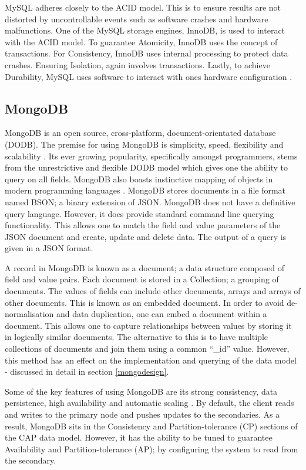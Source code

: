 MySQL adheres closely to the ACID model. This is to ensure results are not distorted by uncontrollable events such as software crashes and hardware malfunctions. One of the MySQL storage engines, InnoDB, is used to interact with the ACID model. To guarantee Atomicity, InnoDB uses the concept of transactions. For Consistency, InnoDB uses internal processing to protect data crashes. Ensuring Isolation, again involves transactions. Lastly, to achieve Durability, MySQL uses software to interact with ones hardware configuration \cite{mysqlacid}.

\subsection{MongoDB}\label{mongo}
MongoDB is an open source, cross-platform, document-orientated database (DODB). The premise for using MongoDB is simplicity, speed, flexibility and scalability \cite{md}. Its ever growing popularity, specifically amongst programmers, stems from the unrestrictive and flexible DODB model which gives one the ability to query on all fields. MongoDB also boasts instinctive mapping of objects in modern programming languages \cite{md}. MongoDB stores documents in a file format named BSON; a binary extension of JSON. MongoDB does not have a definitive query language. However, it does provide standard command line querying functionality. This allows one to match the field and value parameters of the JSON document and create, update and delete data. The output of a query is given in a JSON format.

A record in MongoDB is known as a document; a data structure composed of field and value pairs. Each document is stored in a Collection; a grouping of documents. The values of fields can include other documents, arrays and arrays of other documents. This is known as an embedded document. In order to avoid de-normalisation and data duplication, one can embed a document within a document. This allows one to capture relationships between values by storing it in logically similar documents. The alternative to this is to have multiple collections of documents and join them using a common ``\_id'' value. However, this method has an effect on the implementation and querying of the data model - discussed in detail in section \ref{mongodesign}.

Some of the key features of using MongoDB are its strong consistency, data persistence, high availability and automatic scaling \cite{md}. By default, the client reads and writes to the primary node and pushes updates to the secondaries. As a result, MongoDB sits in the Consistency and Partition-tolerance (CP) sections of the CAP data model. However, it has the ability to be tuned to guarantee Availability and Partition-tolerance (AP); by configuring the system to read from the secondary.

